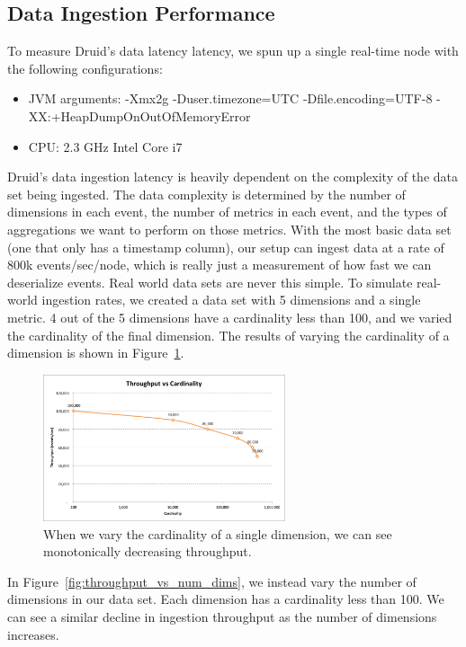 \documentclass{acm_proc_article-sp}
\begin{document}
\subsection{Data Ingestion Performance}
To measure Druid's data latency latency, we spun up a single real-time node
with the following configurations:
\begin{itemize}
\item JVM arguments: -Xmx2g -Duser.timezone=UTC -Dfile.encoding=UTF-8 -XX:+HeapDumpOnOutOfMemoryError
\item CPU: 2.3 GHz Intel Core i7 
\end{itemize}

Druid's data ingestion latency is heavily dependent on the complexity of the
data set being ingested. The data complexity is determined by the number of
dimensions in each event, the number of metrics in each event, and the types of
aggregations we want to perform on those metrics. With the most basic data set
(one that only has a timestamp column), our setup can ingest data at a rate of
800k events/sec/node, which is really just a measurement of how fast we can
deserialize events. Real world data sets are never this simple. To simulate
real-world ingestion rates, we created a data set with 5 dimensions and a
single metric. 4 out of the 5 dimensions have a cardinality less than 100, and
we varied the cardinality of the final dimension. The results of varying the
cardinality of a dimension is shown in
Figure~\ref{fig:throughput_vs_cardinality}.

\begin{figure}
\centering
\includegraphics[width = 2.8in]{throughput_vs_cardinality}
\caption{When we vary the cardinality of a single dimension, we can see monotonically decreasing throughput.}
\label{fig:throughput_vs_cardinality}
\end{figure}

In Figure~\ref{fig:throughput_vs_num_dims}, we instead vary the number of
dimensions in our data set. Each dimension has a cardinality less than 100. We
can see a similar decline in ingestion throughput as the number of dimensions
increases.
\end{document}
